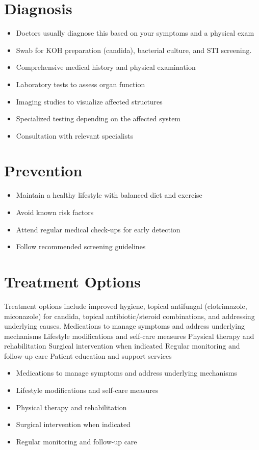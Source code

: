 \section{Diagnosis}
\begin{itemize}[noitemsep]
  \item Doctors usually diagnose this based on your symptoms and a physical exam
  \item Swab for KOH preparation (candida), bacterial culture, and STI screening.
  \item Comprehensive medical history and physical examination
  \item Laboratory tests to assess organ function
  \item Imaging studies to visualize affected structures
  \item Specialized testing depending on the affected system
  \item Consultation with relevant specialists
\end{itemize}
\section{Prevention}
\begin{itemize}[noitemsep]
  \item Maintain a healthy lifestyle with balanced diet and exercise
  \item Avoid known risk factors
  \item Attend regular medical check-ups for early detection
  \item Follow recommended screening guidelines
\end{itemize}
\section{Treatment Options}
Treatment options include improved hygiene, topical antifungal (clotrimazole, miconazole) for candida, topical antibiotic/steroid combinations, and addressing underlying causes. Medications to manage symptoms and address underlying mechanisms Lifestyle modifications and self-care measures Physical therapy and rehabilitation Surgical intervention when indicated Regular monitoring and follow-up care Patient education and support services

\begin{itemize}[noitemsep]
  \item Medications to manage symptoms and address underlying mechanisms
  \item Lifestyle modifications and self-care measures
  \item Physical therapy and rehabilitation
  \item Surgical intervention when indicated
  \item Regular monitoring and follow-up care
\end{itemize}
